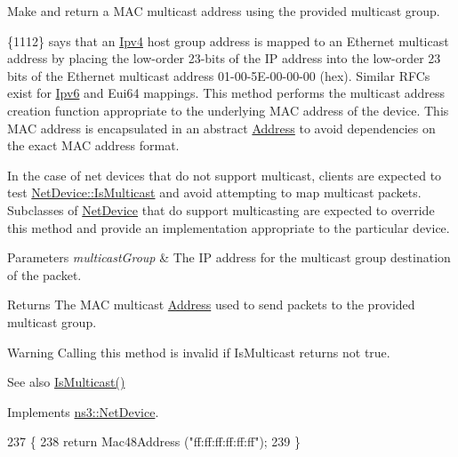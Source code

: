 Make and return a M\+AC multicast address using the provided multicast group. 

\{1112\} says that an \hyperlink{classns3_1_1Ipv4}{Ipv4} host group address is mapped to an Ethernet multicast address by placing the low-\/order 23-\/bits of the IP address into the low-\/order 23 bits of the Ethernet multicast address 01-\/00-\/5\+E-\/00-\/00-\/00 (hex). Similar R\+F\+Cs exist for \hyperlink{classns3_1_1Ipv6}{Ipv6} and Eui64 mappings. This method performs the multicast address creation function appropriate to the underlying M\+AC address of the device. This M\+AC address is encapsulated in an abstract \hyperlink{classns3_1_1Address}{Address} to avoid dependencies on the exact M\+AC address format.

In the case of net devices that do not support multicast, clients are expected to test \hyperlink{classns3_1_1NetDevice_a1afb4848a9226540f1ff51f9b31ae95e}{Net\+Device\+::\+Is\+Multicast} and avoid attempting to map multicast packets. Subclasses of \hyperlink{classns3_1_1NetDevice}{Net\+Device} that do support multicasting are expected to override this method and provide an implementation appropriate to the particular device.


\begin{DoxyParams}{Parameters}
{\em multicast\+Group} & The IP address for the multicast group destination of the packet. \\
\hline
\end{DoxyParams}
\begin{DoxyReturn}{Returns}
The M\+AC multicast \hyperlink{classns3_1_1Address}{Address} used to send packets to the provided multicast group.
\end{DoxyReturn}
\begin{DoxyWarning}{Warning}
Calling this method is invalid if Is\+Multicast returns not true. 
\end{DoxyWarning}
\begin{DoxySeeAlso}{See also}
\hyperlink{classns3_1_1VirtualNetDevice_a6a431d51ea635ffbe87e1bb9745cd781}{Is\+Multicast()} 
\end{DoxySeeAlso}


Implements \hyperlink{classns3_1_1NetDevice_a98aa4852df367b6a393c8cc1d88af0d9}{ns3\+::\+Net\+Device}.


\begin{DoxyCode}
237 \{
238   \textcolor{keywordflow}{return} Mac48Address (\textcolor{stringliteral}{"ff:ff:ff:ff:ff:ff"});
239 \}
\end{DoxyCode}
